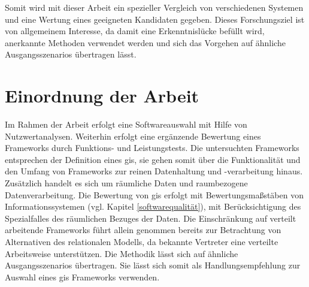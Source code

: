 Somit wird mit dieser Arbeit ein spezieller Vergleich von verschiedenen Systemen und eine Wertung eines geeigneten Kandidaten gegeben.
Dieses Forschungsziel ist von allgemeinem Interesse, da damit eine Erkenntnislücke befüllt wird, anerkannte Methoden verwendet werden und sich das Vorgehen auf ähnliche Ausgangsszenarios übertragen lässt.

\section{Einordnung der Arbeit}
Im Rahmen der Arbeit erfolgt eine Softwareauswahl mit Hilfe von Nutzwertanalysen.
Weiterhin erfolgt eine ergänzende Bewertung eines Frameworks durch Funktions- und Leistungstests.
Die untersuchten Frameworks entsprechen der Definition eines \Gls{gis}, sie gehen somit über die Funktionalität und den Umfang von Frameworks zur reinen Datenhaltung und -ver\-ar\-beitung hinaus.
Zusätzlich handelt es sich um räumliche Daten und raumbezogene Datenverarbeitung.
Die Bewertung von \Gls{gis} erfolgt mit Bewertungsmaßstäben von Informationssystemen (vgl. Kapitel \ref{softwarequalität}), mit Berücksichtigung des Spezialfalles des räumlichen Bezuges der Daten.
Die Einschränkung auf verteilt arbeitende Frameworks führt allein genommen bereits zur Betrachtung von Alternativen des relationalen Modells, da bekannte Vertreter eine verteilte Arbeitsweise unterstützen.
Die Methodik lässt sich auf ähnliche Ausgangsszenarios übertragen.
Sie lässt sich somit als Handlungsempfehlung zur Auswahl eines \Gls{gis} Frameworks verwenden.


